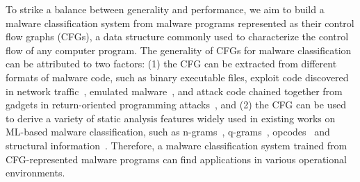 To strike a balance between generality and performance, we aim to build a malware classification system from malware programs represented as their control flow graphs (CFGs), a data structure commonly used to characterize the control flow of any computer program.
The generality of CFGs for malware classification can be attributed to two factors:
(1) the CFG can be extracted from different formats of malware code, such as binary executable files, exploit code discovered in network traffic~\cite{zhang2007analyzing}, emulated malware~\cite{sharif2009automatic},
and attack code chained together from gadgets in return-oriented programming attacks~\cite{shacham2007geometry},
and (2) the CFG can be used to derive a variety of static analysis features widely used in existing works on ML-based malware classification,
such as n-grams~\cite{NgramMalwareDetect}, q-grams~\cite{QgramMalwareDetect}, opcodes~\cite{bilar2007opcodes} and structural information~\cite{kong2013discriminant}.
Therefore, a malware classification system trained from CFG-represented malware programs can find applications in various operational environments.



